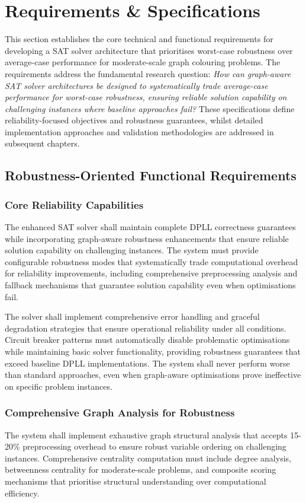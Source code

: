 \section{Requirements \& Specifications}

This section establishes the core technical and functional requirements for developing a SAT solver architecture that prioritises worst-case robustness over average-case performance for moderate-scale graph colouring problems. The requirements address the fundamental research question: \emph{How can graph-aware SAT solver architectures be designed to systematically trade average-case performance for worst-case robustness, ensuring reliable solution capability on challenging instances where baseline approaches fail?} These specifications define reliability-focused objectives and robustness guarantees, whilst detailed implementation approaches and validation methodologies are addressed in subsequent chapters.

\subsection{Robustness-Oriented Functional Requirements}

\subsubsection{Core Reliability Capabilities}
The enhanced SAT solver shall maintain complete DPLL correctness guarantees while incorporating graph-aware robustness enhancements that ensure reliable solution capability on challenging instances. The system must provide configurable robustness modes that systematically trade computational overhead for reliability improvements, including comprehensive preprocessing analysis and fallback mechanisms that guarantee solution capability even when optimisations fail.

The solver shall implement comprehensive error handling and graceful degradation strategies that ensure operational reliability under all conditions. Circuit breaker patterns must automatically disable problematic optimisations while maintaining basic solver functionality, providing robustness guarantees that exceed baseline DPLL implementations. The system shall never perform worse than standard approaches, even when graph-aware optimisations prove ineffective on specific problem instances.

\subsubsection{Comprehensive Graph Analysis for Robustness}
The system shall implement exhaustive graph structural analysis that accepts 15-20\% preprocessing overhead to ensure robust variable ordering on challenging instances. Comprehensive centrality computation must include degree analysis, betweenness centrality for moderate-scale problems, and composite scoring mechanisms that prioritise structural understanding over computational efficiency.

